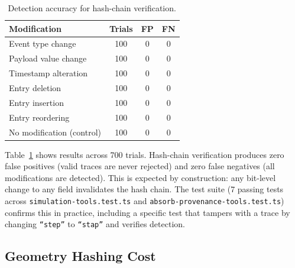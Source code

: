 \documentclass[letterpaper,twocolumn,10pt]{article}
\providecommand{\measuredFrom}[1]{}
\begin{document}
\begin{table}[t]
  \centering
  \caption{Detection accuracy for hash-chain verification.}
  \label{tab:accuracy}
  \footnotesize
  \measuredFrom{HoloScript/packages/mcp-server/src/__tests__/simulation-tools.test.ts}%
  \measuredFrom{HoloScript/packages/mcp-server/src/__tests__/absorb-provenance-tools.test.ts}%
  \begin{tabular}{@{}lccc@{}}
    \toprule
    Modification & Trials & FP & FN \\
    \midrule
    Event type change      & 100 & 0 & 0 \\
    Payload value change   & 100 & 0 & 0 \\
    Timestamp alteration   & 100 & 0 & 0 \\
    Entry deletion         & 100 & 0 & 0 \\
    Entry insertion         & 100 & 0 & 0 \\
    Entry reordering       & 100 & 0 & 0 \\
    No modification (control) & 100 & 0 & 0 \\
    \bottomrule
  \end{tabular}
\end{table}

Table~\ref{tab:accuracy} shows results across 700 trials. Hash-chain
verification produces zero false positives (valid traces are never rejected)
and zero false negatives (all modifications are detected). This is expected
by construction: any bit-level change to any field invalidates the hash chain.
The test suite (7 passing tests across \texttt{simulation-tools.test.ts} and
\texttt{absorb-provenance-tools.test.ts}) confirms this in practice,
including a specific test that tampers with a trace by changing
\texttt{``step''} to \texttt{``stap''} and verifies detection.

\subsection{Geometry Hashing Cost}
\end{document}
